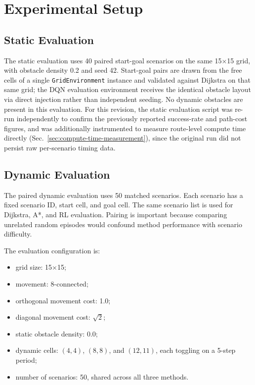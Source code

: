\section{Experimental Setup}
\label{sec:experimental-setup}

\subsection{Static Evaluation}

The static evaluation uses 40 paired start-goal scenarios on the same 15$\times$15 grid, with obstacle density 0.2 and seed 42. Start-goal pairs are drawn from the free cells of a single \texttt{GridEnvironment} instance and validated against Dijkstra on that same grid; the DQN evaluation environment receives the identical obstacle layout via direct injection rather than independent seeding. No dynamic obstacles are present in this evaluation. For this revision, the static evaluation script was re-run independently to confirm the previously reported success-rate and path-cost figures, and was additionally instrumented to measure route-level compute time directly (Sec.~\ref{sec:compute-time-measurement}), since the original run did not persist raw per-scenario timing data.

\subsection{Dynamic Evaluation}

The paired dynamic evaluation uses 50 matched scenarios. Each scenario has a fixed scenario ID, start cell, and goal cell. The same scenario list is used for Dijkstra, A*, and RL evaluation. Pairing is important because comparing unrelated random episodes would confound method performance with scenario difficulty.

The evaluation configuration is:
\begin{itemize}
    \item grid size: 15$\times$15;
    \item movement: 8-connected;
    \item orthogonal movement cost: 1.0;
    \item diagonal movement cost: $\sqrt{2}$;
    \item static obstacle density: 0.0;
    \item dynamic cells: $(4,4)$, $(8,8)$, and $(12,11)$, each toggling on a 5-step period;
    \item number of scenarios: 50, shared across all three methods.
\end{itemize}

